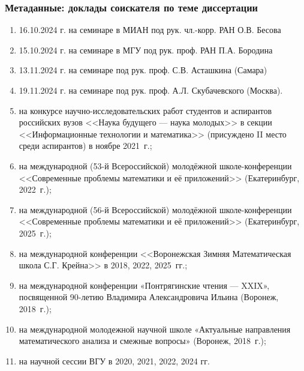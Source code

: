 \begin{frame}\frametitle{Метаданные: доклады соискателя по теме диссертации}
	\begin{enumerate}
		\item
			16.10.2024 г. на семинаре в МИАН под рук. чл.-корр. РАН О.В. Бесова
		\item
			15.10.2024 г. на семинаре в МГУ под рук. проф. РАН П.А. Бородина
		\item
			13.11.2024 г. на семинаре под рук. проф. С.В. Асташкина (Самара)
		\item
			19.11.2024 г. на семинаре под рук. проф. А.Л. Скубачевского (Москва).
		\item
			на конкурсе научно-исследовательских работ студентов и аспирантов российских вузов
			<<Наука будущего --- наука молодых>> в секции <<Информационные технологии и математика>>
			(присуждено II место среди аспирантов) в ноябре 2021~г.;
		\item
			на международной (53-й Всероссийской) молодёжной школе-конференции
			<<Современные проблемы математики и её приложений>>
			(Екатеринбург, 2022~г.);
		\item
			на международной (56-й Всероссийской) молодёжной школе-конференции
			<<Современные проблемы математики и её приложений>>
			(Екатеринбург, 2025~г.);
		\item
			на международной конференции <<Воронежская Зимняя Математическая школа С.Г. Крейна>> в 2018, 2022, 2025~гг.;
		\item
			на международной конференции «Понтрягинские чтения — XXIX», посвященной 90-летию Владимира Александровича Ильина (Воронеж, 2018~г.);
		\item
			на международной молодежной научной школе «Актуальные направления математического анализа и смежные вопросы» (Воронеж, 2018~г.);
		\item
			на научной сессии ВГУ в 2020, 2021, 2022, 2024 гг.

	\end{enumerate}
\end{frame}
